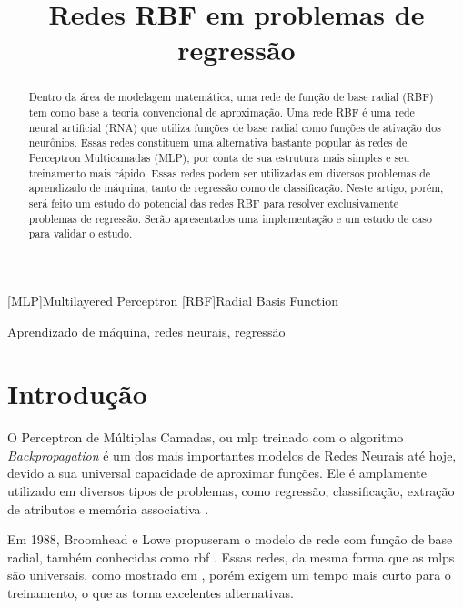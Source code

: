 \documentclass[conference]{IEEEtran}
\title{Redes RBF em problemas de regressão}
\author{\IEEEauthorblockN{Vítor de Albuquerque Torreão}
	\IEEEauthorblockA{Departamento de Estatística e Informática\\
		Universidade Federal Rural de Pernambuco\\
		Recife, Pernambuco\\
		Email: vdat@mail.com}}
\begin{document}
\maketitle

\begin{acronym}
[MLP]{Multilayered Perceptron}
[RBF]{Radial Basis Function}
\end{acronym}

\begin{abstract}
Dentro da área de modelagem matemática, uma rede de função de base radial (RBF) 
tem como base a teoria convencional de aproximação. Uma rede RBF é uma rede 
neural artificial (RNA) que utiliza funções de base radial como 
funções de ativação dos neurônios. Essas redes constituem uma alternativa 
bastante popular às redes de Perceptron Multicamadas (MLP), por conta de sua 
estrutura mais simples e seu treinamento mais rápido. Essas redes podem ser 
utilizadas em diversos problemas de aprendizado de máquina, tanto de regressão 
como de classificação. Neste artigo, porém, será feito um estudo do potencial 
das redes RBF para resolver exclusivamente problemas de regressão. Serão 
apresentados uma implementação e um estudo de caso para validar o estudo.
\end{abstract}

\begin{IEEEkeywords}
Aprendizado de máquina, redes neurais, regressão
\end{IEEEkeywords}

\section{Introdução}
\label{introducao}

O Perceptron de Múltiplas Camadas, ou \ac{mlp} treinado com o algoritmo \textit{
Backpropagation} \cite{Rumelhart:1988:LIR:65669.104449} é um dos mais 
importantes modelos de Redes Neurais até hoje, devido a sua universal capacidade 
de aproximar funções. Ele é amplamente utilizado em diversos tipos de problemas, 
como regressão, classificação, extração de atributos e memória associativa 
\cite{wu2012using}.

Em 1988, Broomhead e Lowe propuseram o modelo de rede com função de base radial, 
também conhecidas como \ac{rbf} \cite{2144306}. Essas redes, da mesma forma que 
as \acp*{mlp} são universais, como mostrado em 
\cite{Park:1991:UAU:110084.110093}, porém exigem um tempo mais curto para o 
treinamento, o que as torna excelentes alternativas.
\end{document}
